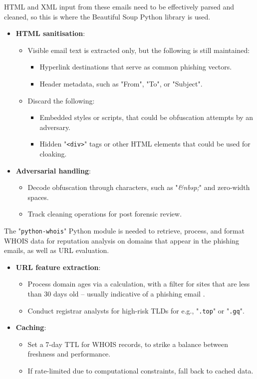 \noindent HTML and XML input from these emails need to be effectively parsed and cleaned, so this is where the Beautiful Soup Python library is used.

\begin{itemize}
  \item \textbf{HTML sanitisation}:
  \begin{itemize}
    \item Visible email text is extracted only, but the following is still maintained:
    \begin{itemize}
      \item Hyperlink destinations that serve as common phishing vectors.
      \item Header metadata, such as "From", "To", or "Subject".
    \end{itemize}
    \item Discard the following:
    \begin{itemize}
      \item Embedded styles or scripts, that could be obfuscation attempts by an adversary.
      \item Hidden "\texttt{<div>}" tags or other HTML elements that could be used for cloaking.
    \end{itemize}
  \end{itemize}
  \item \textbf{Adversarial handling}:
  \begin{itemize}
    \item Decode obfuscation through characters, such as "\textit{\&nbsp;}" and zero-width spaces.
    \item Track cleaning operations for post forensic review.
  \end{itemize}
\end{itemize}

\noindent The "\texttt{python-whois}" Python module is needed to retrieve, process, and format WHOIS data for reputation analysis on domains that appear in the phishing emails, as well as URL evaluation.

\begin{itemize}
  \item \textbf{URL feature extraction}:
  \begin{itemize}
    \item Process domain ages via a calculation, with a filter for sites that are less than 30 days old -- usually indicative of a phishing email \citep{palaniappan2020malicious}.
    \item Conduct registrar analysts for high-risk TLDs for e.g., "\texttt{.top}" or "\texttt{.gq}".
  \end{itemize}
  \item \textbf{Caching}:
  \begin{itemize}
    \item Set a 7-day TTL for WHOIS records, to strike a balance between freshness and performance.
    \item If rate-limited due to computational constraints, fall back to cached data.
  \end{itemize}
\end{itemize}
